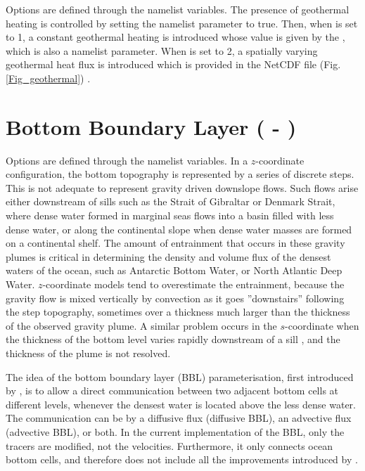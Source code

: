 Options are defined through the   namelist variables.
The presence of geothermal heating is controlled by setting the namelist 
parameter   to true. Then, when  is set to 1, 
a constant geothermal heating is introduced whose value is given by the 
, which is also a namelist parameter. 
When   is set to 2, a spatially varying geothermal heat flux is 
introduced which is provided in the  NetCDF file 
(Fig.\ref{Fig_geothermal}) \citep{Emile-Geay_Madec_OS09}.

\section  [Bottom Boundary Layer (\mdl{trabbl} - \key{trabbl})]
		{Bottom Boundary Layer ( - )}
\label{TRA_bbl}

Options are defined through the   namelist variables.
In a $z$-coordinate configuration, the bottom topography is represented by a 
series of discrete steps. This is not adequate to represent gravity driven 
downslope flows. Such flows arise either downstream of sills such as the Strait of 
Gibraltar or Denmark Strait, where dense water formed in marginal seas flows 
into a basin filled with less dense water, or along the continental slope when dense 
water masses are formed on a continental shelf. The amount of entrainment 
that occurs in these gravity plumes is critical in determining the density 
and volume flux of the densest waters of the ocean, such as Antarctic Bottom Water, 
or North Atlantic Deep Water. $z$-coordinate models tend to overestimate the 
entrainment, because the gravity flow is mixed vertically by convection 
as it goes ''downstairs'' following the step topography, sometimes over a thickness 
much larger than the thickness of the observed gravity plume. A similar problem 
occurs in the $s$-coordinate when the thickness of the bottom level varies rapidly 
downstream of a sill \citep{Willebrand_al_PO01}, and the thickness 
of the plume is not resolved. 

The idea of the bottom boundary layer (BBL) parameterisation, first introduced by 
\citet{Beckmann_Doscher1997}, is to allow a direct communication between 
two adjacent bottom cells at different levels, whenever the densest water is 
located above the less dense water. The communication can be by a diffusive flux
(diffusive BBL), an advective flux (advective BBL), or both. In the current 
implementation of the BBL, only the tracers are modified, not the velocities. 
Furthermore, it only connects ocean bottom cells, and therefore does not include 
all the improvements introduced by \citet{Campin_Goosse_Tel99}.

